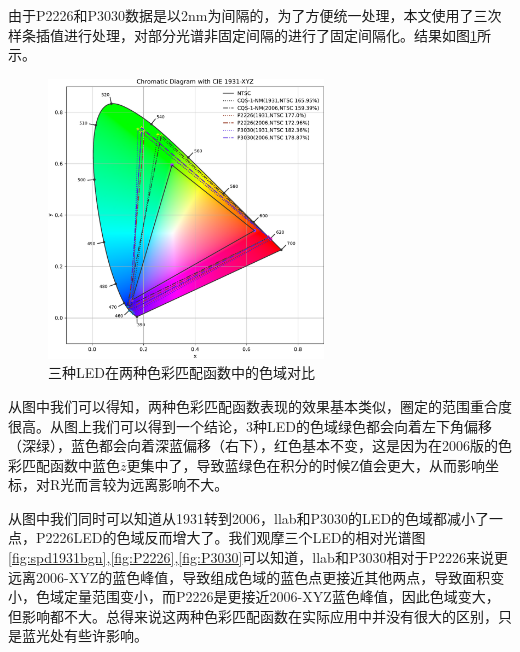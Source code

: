 由于P2226和P3030数据是以2nm为间隔的，为了方便统一处理，本文使用了三次样条插值进行处理，对部分光谱非固定间隔的进行了固定间隔化。结果如图\ref{fig:cmpdifled}所示。

\begin{figure}[htbp]
    \centering
    \includegraphics[width=0.65\textwidth]{./imgs/sec4/P3030-cmparea-sd.pdf}
    \caption{三种LED在两种色彩匹配函数中的色域对比}
    \label{fig:cmpdifled}
\end{figure}

从图中我们可以得知，两种色彩匹配函数表现的效果基本类似，圈定的范围重合度很高。从图上我们可以得到一个结论，3种LED的色域绿色都会向着左下角偏移（深绿），蓝色都会向着深蓝偏移（右下），红色基本不变，这是因为在2006版的色彩匹配函数中蓝色$\overline z$更集中了，导致蓝绿色在积分的时候Z值会更大，从而影响坐标，对R光而言较为远离影响不大。

从图中我们同时可以知道从1931转到2006，llab和P3030的LED的色域都减小了一点，P2226LED的色域反而增大了。我们观摩三个LED的相对光谱图\ref{fig:spd1931bgn},\ref{fig:P2226},\ref{fig:P3030}可以知道，llab和P3030相对于P2226来说更远离2006-XYZ的蓝色峰值，导致组成色域的蓝色点更接近其他两点，导致面积变小，色域定量范围变小，而P2226是更接近2006-XYZ蓝色峰值，因此色域变大，但影响都不大。总得来说这两种色彩匹配函数在实际应用中并没有很大的区别，只是蓝光处有些许影响。